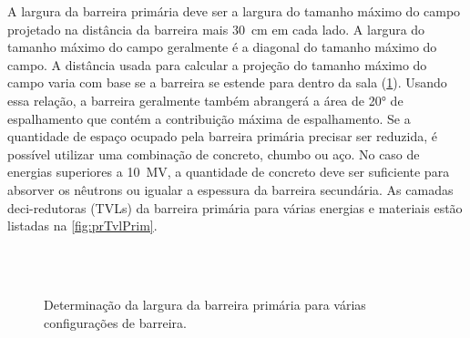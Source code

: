 \documentclass[11pt,a4paper]{article}
\begin{document}
	A largura da barreira primária deve ser a largura do tamanho máximo do campo projetado na distância da barreira mais \SI{30}{\centi\meter} em cada lado. A largura do tamanho máximo do campo geralmente é a diagonal do tamanho máximo do campo. A distância usada para calcular a projeção do tamanho máximo do campo varia com base se a barreira se estende para dentro da sala (\ref{fig:prPrim}). Usando essa relação, a barreira geralmente também abrangerá a área de \ang{20} de espalhamento que contém a contribuição máxima de espalhamento. Se a quantidade de espaço ocupado pela barreira primária precisar ser reduzida, é possível utilizar uma combinação de concreto, chumbo ou aço. No caso de energias superiores a \SI{10}{\mega\volt}, a quantidade de concreto deve ser suficiente para absorver os nêutrons ou igualar a espessura da barreira secundária. As camadas deci-redutoras (TVLs) da barreira primária para várias energias e materiais estão listadas na \ref{fig:prTvlPrim}.

	\begin{figure}[h]
		\centering
		 \\ %
		 \\ %
		\caption{Determinação da largura da barreira primária para várias configurações de barreira.}
		\label{fig:prPrim}
	\end{figure}
\end{document}
